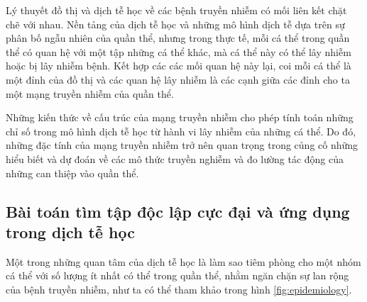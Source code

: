 \documentclass[14pt, oneside, a4paper, openany]{scrartcl}
\begin{document}
Lý thuyết đồ thị và dịch tễ học về các bệnh truyền nhiễm có mối liên kết chặt chẽ với nhau. Nền tảng của dịch tễ học và những mô hình dịch tễ dựa trên sự phân bố ngẫu nhiên của quần thể, nhưng trong thực tế, mỗi cá thể trong quần thể có quan hệ với một tập những cá thể khác, mà cá thể này có thể lây nhiễm hoặc bị lây nhiễm bệnh. Kết hợp các các mối quan hệ này lại, coi mỗi cá thể là một đỉnh của đồ thị và các quan hệ lây nhiễm là các cạnh giữa các đỉnh cho ta một mạng truyền nhiễm của quần thể.

Những kiến thức về cấu trúc của mạng truyền nhiễm cho phép tính toán những chỉ số trong mô hình dịch tễ học từ hành vi lây nhiễm của những cá thể. Do đó, những đặc tính của mạng truyền nhiễm trở nên quan trọng trong củng cố những hiểu biết và dự đoán về các mô thức truyền nghiễm và đo lường tác động của những can thiệp vào quần thể.

\subsection{Bài toán tìm tập độc lập cực đại và ứng dụng trong dịch tễ học}

Một trong những quan tâm của dịch tễ học là làm sao tiêm phòng cho một nhóm cá thể với số lượng ít nhất có thể trong quần thể, nhằm ngăn chặn sự lan rộng của bệnh truyền nhiễm, như ta có thể tham khảo trong hình \ref{fig:epidemiology}.
\end{document}
